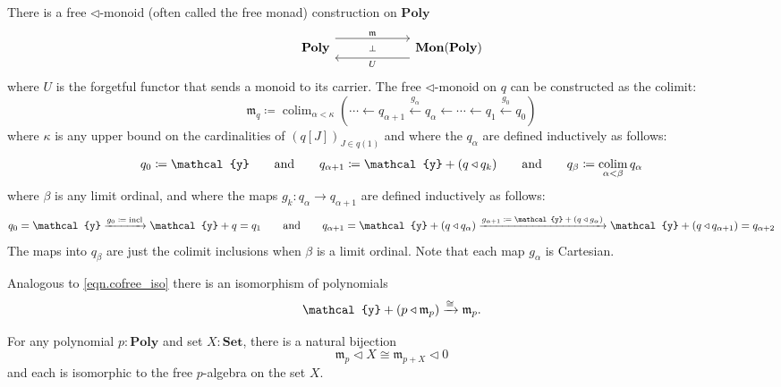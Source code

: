 \documentclass[11pt, one side, article]{memoir}
\theoremstyle{definition}
\theoremstyle{plain}
\DeclareMathOperator*{\colim}{colim}
\newcommand{\Cat}[1]{\mathbf{#1}}%
\newcommand{\To}[2][]{\xrightarrow[#1]{\tn{$#2$}}}
\newcommand{\from}{\leftarrow}
\newcommand{\From}[1]{\xleftarrow{#1}}
\newcommand{\tn}[1]{\textnormal{#1}}
\newcommand{\smset}{\Cat{Set}}
\newcommand{\yon}{{\mathcal{y}}}
\newcommand{\poly}{\Cat{Poly}}
\newcommand{\0}{\textsf{0}}
\newcommand{\1}{\tn{\textsf{1}}}
\newcommand{\tri}{\mathbin{\triangleleft}}
\newcommand{\free}{\mathfrak{m}}
\newcommand{\hh}[2][]{#1 \tn{#2} #1}
\newcommand{\qqand}{\hh[\qquad]{and}}
\begin{document}
There is a free $\tri$-monoid (often called the free monad) construction on $\poly$
\begin{equation}\label{eqn.free_monad}
\begin{tikzcd}[column sep=60pt]
	\poly
  	\ar[from=r, shift left=8pt, "U"]
		\ar[from=r, phantom, "\scriptstyle\bot"]
  	&
	\Cat{Mon}(\poly)
		\ar[from=l, shift right=-8pt, "\free"]
\end{tikzcd}
\end{equation}
where $U$ is the forgetful functor that sends a monoid to its carrier. 
The free $\tri$-monoid on $q$ can be constructed as the colimit:
\begin{equation}
	\free_q\coloneqq\colim_{\alpha<\kappa}(\cdots\from q_{\alpha+1}\From{g_\alpha}q_\alpha\from\cdots\from q_1\From{g_0} q_0)
\end{equation}
where $\kappa$ is any upper bound on the cardinalities of $(q[J])_{J\in q(1)}$ and where the $q_\alpha$ are defined inductively as follows:
\begin{equation}
	q_0\coloneqq \yon
	\qqand
	q_{\alpha+1}\coloneqq \yon+(q\tri q_k)
	\qqand
	q_\beta\coloneqq\colim_{\alpha<\beta}q_\alpha
\end{equation}
where $\beta$ is any limit ordinal, and where the maps $g_k\colon q_{\alpha}\to q_{\alpha+1}$ are defined inductively as follows:
\begin{equation}
	q_0=\yon
	\To{g_0\coloneqq\tn{incl}}\yon+q=q_1
	\qqand
	q_{\alpha+1}=\yon+(q\tri q_{\alpha})
	\To{g_{\alpha+1}\coloneqq\yon+(q\tri g_\alpha)}\yon+(q\tri q_{\alpha+1})=q_{\alpha+2}
\end{equation}
The maps into $q_\beta$ are just the colimit inclusions when $\beta$ is a limit ordinal. Note that each map $g_\alpha$ is Cartesian. 

Analogous to \cref{eqn.cofree_iso} there is an isomorphism of polynomials
\begin{equation}
	 \yon+(p\tri\free_p)\To{\cong}\free_p.
	\end{equation}


For any polynomial $p:\poly$ and set $X:\smset$, there is a natural bijection
\begin{equation}
  \free_p\tri X
  \cong
	\free_{p+X}\tri 0  
\end{equation}
and each is isomorphic to the free $p$-algebra on the set $X$.
\end{document}
